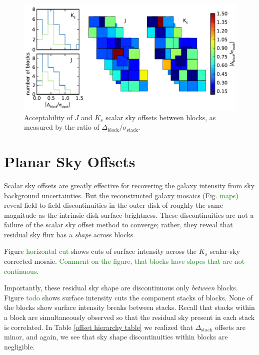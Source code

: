 \documentclass[iop]{emulateapj}
\newcommand{\todo}[1]{\textcolor{green}{#1}} %
\begin{document}
\begin{figure}[t]
    \centering
        \includegraphics[width=6in]{figs/offset_ratio_map_enhanced}
    \caption{Acceptability of $J$ and $K_s$ scalar sky offsets between blocks, as measured by the ratio of $\Delta_\mathrm{block}/\sigma_\mathrm{stack}$.}
    \label{fig:offset_ratio_map}
\end{figure}




\section{Planar Sky Offsets}

Scalar sky offsets are greatly effective for recovering the galaxy intensity from sky background uncertainties. But the reconstructed galaxy mosaics (Fig. \todo{maps}) reveal field-to-field discontinuities in the outer disk of roughly the same magnitude as the intrinsic disk surface brightness. These discontinuities are not a failure of the scalar sky offset method to converge; rather, they reveal that residual sky flux has a \emph{shape} across blocks.

Figure \todo{horizontal cut} shows cuts of surface intensity across the $K_s$ scalar-sky corrected mosaic. \todo{Comment on the figure, that blocks have slopes that are not continuous}.

Importantly, these residual sky shape are discontinuous only \emph{between} blocks. Figure \todo{todo} shows surface intensity cuts the component stacks of blocks. None of the blocks show surface intensity breaks between stacks. Recall that stacks within a block are simultaneously observed so that the residual sky present in each stack is correlated. In Table \ref{offset hierarchy table} we realized that $\Delta_\mathrm{stack}$ offsets are minor, and again, we see that sky shape discontinuities within blocks are negligible.
\end{document}
